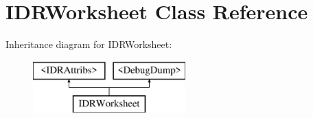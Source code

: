\hypertarget{interface_i_d_r_worksheet}{
\section{IDRWorksheet Class Reference}
\label{interface_i_d_r_worksheet}
}
Inheritance diagram for IDRWorksheet:\begin{figure}[H]
\begin{center}
\leavevmode
\includegraphics[height=2.000000cm]{interface_i_d_r_worksheet}
\end{center}
\end{figure}
